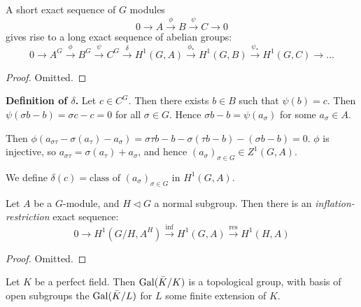 \documentclass[10pt,a4paper]{article}
\begin{document}
\begin{theorem}
  A short exact sequence of $G$ modules
  \[0 \to A \xrightarrow{\phi} B \xrightarrow{\psi} C \to 0\]
  gives rise to a long exact sequence of abelian groups:
  \[0 \to A^G \xrightarrow{\phi} B^G \xrightarrow{\psi} C^G \xrightarrow{\delta} H^1(G,A) \xrightarrow{\phi_\ast} H^1(G,B) \xrightarrow{\psi_\ast} H^1(G,C) \to \ldots\]
\end{theorem}
\begin{proof}
  Omitted.
\end{proof}
\textbf{Definition of $\delta$.} Let $c \in C^G$. Then there exists $b \in B$ such that $\psi(b) = c$. Then $\psi(\sigma b - b) = \sigma c - c = 0$ for all $\sigma \in G$. Hence $\sigma b - b = \psi(a_\sigma)$ for some $a_\sigma \in A$.

Then $\phi(a_{\sigma \tau} - \sigma(a_\tau) - a_\sigma) = \sigma \tau b - b - \sigma(\tau b -b) - (\sigma b -b) = 0$. $\phi$ is injective, so $a_{\sigma \tau} = \sigma(a_\tau) + a_\sigma$, and hence $(a_\sigma)_{\sigma \in G} \in Z^1(G,A)$.

We define $\delta(c) = \text{class of }(a_\sigma)_{\sigma \in G}$ in $H^1(G,A)$.

\begin{theorem}
  Let $A$ be a $G$-module, and $H \triangleleft G$ a normal subgroup. Then there is an \emph{inflation-restriction} exact sequence:
  \[0 \to H^1(G/H, A^H) \xrightarrow{\text{inf}} H^1(G,A) \xrightarrow{\text{res}} H^1(H,A)\]
\end{theorem}
\begin{proof}
  Omitted.
\end{proof}
Let $K$ be a perfect field. Then $\operatorname{Gal}(\bar{K}/K)$ is a topological group, with basis of open subgroups the $\operatorname{Gal}(\bar{K}/L)$ for $L$ some finite extension of $K$.
\end{document}

